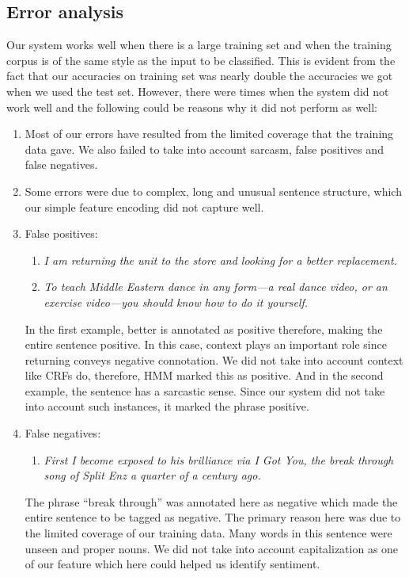 \documentclass{article}
\begin{document}
\subsection{Error analysis}
Our system works well when there is a large training set and when the training corpus is of the same style as the input to be classified. This is evident from the fact that our accuracies on training set was nearly double the accuracies we got when we used the test set. However, there were times when the system did not work well and the following could be reasons why it did not perform as well: 
\begin{enumerate}
\item Most of our errors have resulted from the limited coverage that the training data gave. We also failed to take into account sarcasm, false positives and false negatives.
\item Some errors were due to complex, long and unusual sentence structure, which our simple feature encoding did not capture well.
\item False positives:
  \begin{enumerate}
    \item \textit{I am returning the unit to the store and looking for a \emph{better} replacement.}
    \item \textit{To teach Middle Eastern dance in any form---a real dance video, or an exercise video---you should know how to do it yourself.}
  \end{enumerate}
  In the first example, better is annotated as positive therefore, making the entire sentence positive. In this case, context plays an important role since returning conveys negative connotation. We did not take into account context like CRFs do, therefore, HMM marked this as positive. And in the second example, the sentence has a sarcastic sense. Since our system did not take into account such instances, it marked the phrase positive. 
\item False negatives:
  \begin{enumerate}
  \item \textit{First I become exposed to his brilliance via I Got You, the break through song of Split Enz a quarter of a century ago.}
  \end{enumerate}
  The phrase ``break through'' was annotated here as negative which made the entire sentence to be tagged as negative. The primary reason here was due to the limited coverage of our training data. Many words in this sentence were unseen and proper nouns. We did not take into account capitalization as one of our feature which here could helped us identify sentiment.


\end{enumerate}
\end{document}
